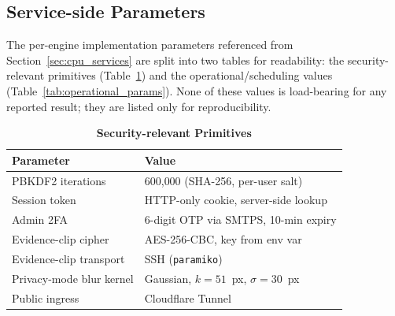 \documentclass{ieeeaccess}
\begin{document}
\begin{table}[ht!]
\caption{\textbf{Deployed Models and Artefacts (Hailo-8L)}}
\label{tab:model_specs}
\setlength{\tabcolsep}{2pt}
\centering\footnotesize
{}
\end{table}


\subsection{Service-side Parameters}
\label{sec:service_params}
The per-engine implementation parameters referenced from Section~\ref{sec:cpu_services} are split into two tables for readability: the security-relevant primitives (Table~\ref{tab:security_params}) and the operational/scheduling values (Table~\ref{tab:operational_params}). None of these values is load-bearing for any reported result; they are listed only for reproducibility.

\begin{table}[ht!]
\caption{\textbf{Security-relevant Primitives}}
\label{tab:security_params}
\setlength{\tabcolsep}{3pt}
\centering\footnotesize
\begin{tabular}{|l|p{4.0cm}|}
\hline
\textbf{Parameter} & \textbf{Value} \\
\hline
PBKDF2 iterations & 600{,}000 (SHA-256, per-user salt) \\
Session token & HTTP-only cookie, server-side lookup \\
Admin 2FA & 6-digit OTP via SMTPS, 10-min expiry \\
Evidence-clip cipher & AES-256-CBC, key from env var \\
Evidence-clip transport & SSH (\texttt{paramiko}) \\
Privacy-mode blur kernel & Gaussian, $k{=}51$~px, $\sigma{=}30$~px \\
Public ingress & Cloudflare Tunnel \\
\hline
\end{tabular}
\end{table}
\end{document}
